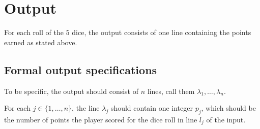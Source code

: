 \pagebreak
\section*{Output}

For each roll of the $5$ dice,
the output consists of one line containing the points earned as stated above.

\subsection*{Formal output specifications}
To be specific, the output should consist of $n$ lines,
call them $\lambda_1, \dots, \lambda_n$.

For each $j\in \{1, \dots, n\}$,
the line $\lambda_j$ should contain one integer $p_j$,
which should be the number of points the player scored
for the dice roll in line $l_j$ of the input.

